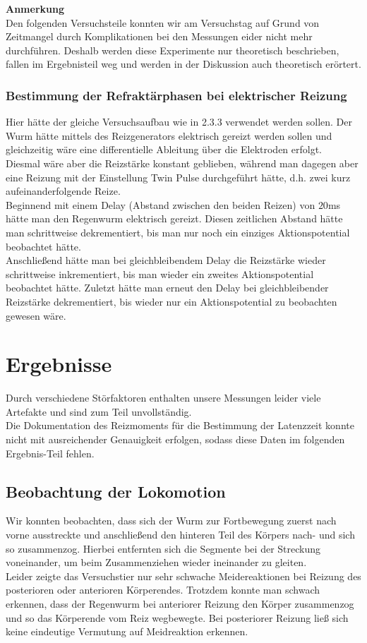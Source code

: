 \documentclass[11pt]{article}
\begin{document}
\textbf{Anmerkung}\\
Den folgenden Versuchsteile konnten wir am Versuchstag auf Grund von Zeitmangel durch Komplikationen bei den Messungen eider nicht mehr durchführen. Deshalb werden diese Experimente nur theoretisch beschrieben, fallen im Ergebnisteil weg und werden in der Diskussion auch theoretisch erörtert. 



\subsubsection{Bestimmung der Refraktärphasen bei elektrischer Reizung}
Hier hätte der gleiche Versuchsaufbau wie in 2.3.3 verwendet werden sollen. Der Wurm hätte mittels des Reizgenerators elektrisch gereizt werden sollen und gleichzeitig wäre eine differentielle Ableitung über die Elektroden erfolgt. \\
Diesmal wäre aber die Reizstärke konstant geblieben, während man dagegen aber eine Reizung mit der Einstellung \glqq Twin Pulse\grqq{} durchgeführt hätte, d.h. zwei kurz aufeinanderfolgende Reize. \\
Beginnend mit einem Delay (Abstand zwischen den beiden Reizen) von $20$ms hätte man den Regenwurm elektrisch gereizt. Diesen zeitlichen Abstand hätte man schrittweise dekrementiert, bis man nur noch ein einziges Aktionspotential beobachtet hätte. \\
Anschließend hätte man bei gleichbleibendem Delay die Reizstärke wieder schrittweise inkrementiert, bis man wieder ein zweites Aktionspotential beobachtet hätte. Zuletzt hätte man erneut den Delay bei gleichbleibender Reizstärke dekrementiert, bis wieder nur ein Aktionspotential zu beobachten gewesen wäre. 


\section{Ergebnisse}
Durch verschiedene Störfaktoren enthalten unsere Messungen leider viele Artefakte und sind zum Teil unvollständig.  \\
Die Dokumentation des Reizmoments für die Bestimmung der Latenzzeit konnte nicht mit ausreichender Genauigkeit erfolgen, sodass diese Daten im folgenden Ergebnis-Teil fehlen. \\

\subsection{Beobachtung der Lokomotion}
Wir konnten beobachten, dass sich der Wurm zur Fortbewegung zuerst nach vorne ausstreckte und anschließend den hinteren Teil des Körpers nach- und sich so zusammenzog. Hierbei entfernten sich die Segmente bei der Streckung voneinander, um beim Zusammenziehen wieder ineinander zu gleiten.\\
Leider zeigte das Versuchstier nur sehr schwache Meidereaktionen bei Reizung des posterioren oder anterioren Körperendes. Trotzdem konnte man schwach erkennen, dass der Regenwurm bei anteriorer Reizung den Körper zusammenzog und so das Körperende vom Reiz wegbewegte. Bei posteriorer Reizung ließ sich keine eindeutige Vermutung auf Meidreaktion erkennen. 
\end{document}
